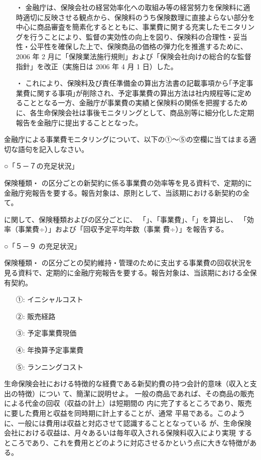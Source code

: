 \documentclass[report,gutter=10mm,fore-edge=10mm,uplatex,dvipdfmx]{jlreq}
\begin{document}
 \begin{itemize}
 \item [・]  金融庁は、保険会社の経営効率化への取組み等の経営努力を保険料に適時適切に反映させる観点から、保険料のうち保険数理に直接よらない部分を中心に商品審査を簡素化するとともに、事業費に関する充実したモニタリングを行うことにより、監督の実効性の向上を図り、保険料の合理性・妥当性・公平性を確保した上で、保険商品の価格の弾力化を推進するために、2006 年 2 月に「保険業法施行規則」および「保険会社向けの総合的な監督指針」を改正（実施日は 2006 年 4 月 1 日）した。
 \item [・]  これにより、保険料及び責任準備金の算出方法書の記載事項から｢予定事業費に関する事項｣が削除され、予定事業費の算出方法は社内規程等に定めることとなる一方、金融庁が事業費の実績と保険料の関係を把握するために、各生命保険会社は事後モニタリングとして、商品別等に細分化した定期報告を金融庁に提出することとなった。
 \end{itemize}

金融庁による事業費モニタリングについて、以下の①～⑤の空欄に当てはまる適切な語句を記入しなさい。

\noindent ○「５－７の充足状況」

保険種類・
の区分ごとの新契約に係る事業費の効率等を見る資料で、定期的に
金融庁宛報告を要する。報告対象は、原則として、当該期における新契約の全て。

に関して、保険種類およびの区分ごとに、
「」、「事業費」、「」を算出し、
「効率（事業費÷）」および「回収予定平均年数（事業
費÷）」を報告する。

\noindent ○「５－９ の充足状況」

保険種類・
の区分ごとの契約維持・管理のために支出する事業費の回収状況を
見る資料で、定期的に金融庁宛報告を要する。報告対象は、当該期における全保有契約。
\answer{}
\begin{itemize}
\item[ ①: ] イニシャルコスト
\item[ ②: ] 販売経路
\item[ ③: ] 予定事業費現価
\item[ ④: ] 年換算予定事業費
\item[ ⑤: ] ランニングコスト
\end{itemize}

生命保険会社における特徴的な経費である新契約費の持つ会計的意味（収入と支出の特徴）につい
て、簡潔に説明せよ。
\answer{}
一般の商品であれば、その商品の販売による代金の回収（収益の計上）は短期間の
内に完了するところであり、販売に要した費用と収益を同時期に計上することが、通常
平易である。このように、一般には費用は収益と対応させて認識することとなっている
が、生命保険会社における収益は、月々あるいは毎年収入される保険料収入により実現
するところであり、これを費用とどのように対応させるかという点に大きな特徴がある。
\end{document}
